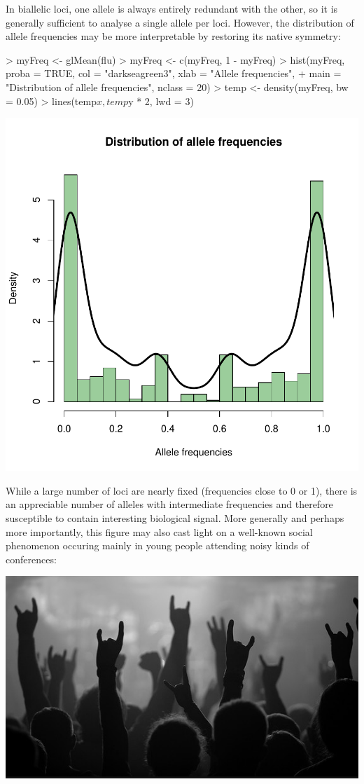 \documentclass{article}
\begin{document}
\noindent In biallelic loci, one allele is always entirely redundant with the other, so it is generally
sufficient to analyse a single allele per loci.
However, the distribution of allele frequencies may be more interpretable by restoring its native symmetry:
\begin{Schunk}
\begin{Sinput}
> myFreq <- glMean(flu)
> myFreq <- c(myFreq, 1 - myFreq)
> hist(myFreq, proba = TRUE, col = "darkseagreen3", xlab = "Allele frequencies", 
+     main = "Distribution of allele frequencies", nclass = 20)
> temp <- density(myFreq, bw = 0.05)
> lines(temp$x, temp$y * 2, lwd = 3)
\end{Sinput}
\end{Schunk}
\includegraphics{figs/genomics-038}

\noindent While a large number of loci are nearly fixed (frequencies close to 0 or 1), there is an
appreciable number of alleles with intermediate frequencies and therefore susceptible to contain
interesting biological signal.
More generally and perhaps more importantly, this figure may also cast light on a well-known social
phenomenon occuring mainly in young people attending noisy kinds of conferences:
\begin{center}
  \includegraphics{figs/devilsign}
\end{center}
\end{document}
